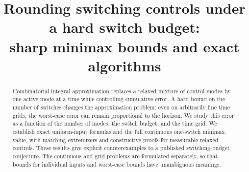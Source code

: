 \documentclass[11pt]{article}
\title{Rounding switching controls under a hard switch budget:\\sharp minimax bounds and exact algorithms}
\author{}
\date{}
\begin{document}
\maketitle
\begin{abstract}
Combinatorial integral approximation replaces a relaxed mixture of control
modes by one active mode at a time while controlling cumulative error. A hard
bound on the number of switches changes the approximation problem: even on
arbitrarily fine time grids, the worst-case error can remain proportional to
the horizon. We study this error as a function of the number of modes, the
switch budget, and the time grid. We establish exact uniform-input formulas
and the full continuous one-switch minimax value, with matching extremizers
and constructive proofs for measurable relaxed controls. These results give
explicit counterexamples to a published switching-budget conjecture. The
continuous and grid problems are formulated separately, so that bounds for
individual inputs and worst-case bounds have unambiguous meanings.
\end{abstract}




\end{document}
